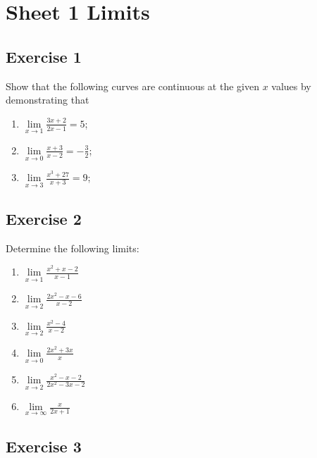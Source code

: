 \documentclass[
  11pt,
  oneside]{book}
\providecommand{\tightlist}{%
  \setlength{\itemsep}{0pt}\setlength{\parskip}{0pt}}
\newcommand{\slide}{}
\theoremstyle{definition}
\theoremstyle{definition}
\theoremstyle{definition}
\theoremstyle{definition}
\theoremstyle{remark}
\begin{document}
\section{Sheet 1 Limits}\label{sheet-1-limits}

\subsection*{Exercise 1}\label{exercise-1}

Show that the following curves are continuous at the given \(x\) values by demonstrating that

\begin{enumerate}
\def\labelenumi{\alph{enumi}.}
\tightlist
\item
  \(\lim\limits_{x\to1}\frac{3x+2}{2x-1} = 5\);
\item
  \(\lim\limits_{x\to0}\frac{x+3}{x-2} = -\frac 32\);
\item
  \(\lim\limits_{x\to3}\frac{x^3+27}{x+3} = 9\);
\end{enumerate}

\slide

\subsection*{Exercise 2}\label{exercise-2}

Determine the following limits:

\begin{enumerate}
\def\labelenumi{\alph{enumi}.}
\tightlist
\item
  \(\lim\limits_{x\to1}\frac{x^2+x-2}{x-1}\)
\item
  \(\lim\limits_{x\to2}\frac{2x^2-x-6}{x-2}\)
\item
  \(\lim\limits_{x\to2}\frac{x^2-4}{x-2}\)
\item
  \(\lim\limits_{x\to0}\frac{2x^2+3x}{x}\)
\item
  \(\lim\limits_{x\to2}\frac{x^2-x-2}{2x^2-3x-2}\)
\item
  \(\lim\limits_{x\to\infty}\frac{x}{2x+1}\)
\end{enumerate}

\slide

\subsection*{Exercise 3}\label{exercise-3}
\end{document}

